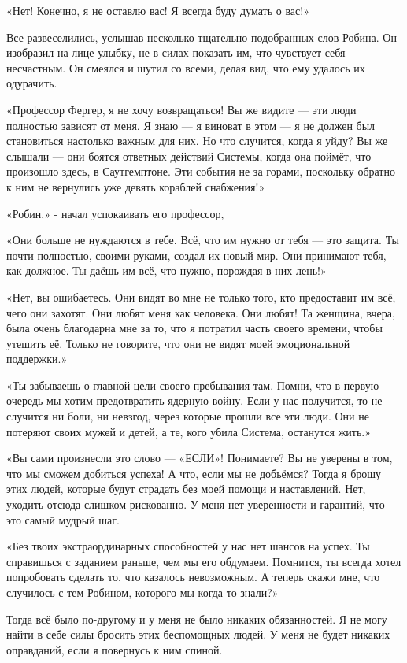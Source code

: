 \documentclass[a4paper,12pt]{book}
\begin{document}
«Нет! Конечно, я не оставлю вас! Я всегда буду думать о вас!»
\par
Все развеселились, услышав несколько тщательно подобранных слов Робина. Он изобразил на лице улыбку, не в силах показать им, что чувствует себя несчастным. Он смеялся и шутил со всеми, делая вид, что ему удалось их одурачить.\\
\par
«Профессор Фергер, я не хочу возвращаться! Вы же видите — эти люди полностью зависят от меня. Я знаю — я виноват в этом — я не должен был становиться настолько важным для них. Но что случится, когда я уйду? Вы же слышали — они боятся ответных действий Системы, когда она поймёт, что произошло здесь, в Саутгемптоне. Эти события не за горами, поскольку обратно к ним не вернулись уже девять кораблей снабжения!»
\par
«Робин,» - начал успокаивать его профессор,
\par
«Они больше не нуждаются в тебе. Всё, что им нужно от тебя — это защита. Ты почти полностью, своими руками, создал их новый мир. Они принимают тебя, как должное. Ты даёшь им всё, что нужно, порождая в них лень!»
\par
«Нет, вы ошибаетесь. Они видят во мне не только того, кто предоставит им всё, чего они захотят. Они любят меня как человека. Они любят! Та женщина, вчера, была очень благодарна мне за то, что я потратил часть своего времени, чтобы утешить её. Только не говорите, что они не видят моей эмоциональной поддержки.»
\par
«Ты забываешь о главной цели своего пребывания там. Помни, что в первую очередь мы хотим предотвратить ядерную войну. Если у нас получится, то не случится ни боли, ни невзгод, через которые прошли все эти люди. Они не потеряют своих мужей и детей, а те, кого убила Система, останутся жить.»
\par
«Вы сами произнесли это слово — «ЕСЛИ»! Понимаете? Вы не уверены в том, что мы сможем добиться успеха! А что, если мы не добьёмся? Тогда я брошу этих людей, которые будут страдать без моей помощи и наставлений. Нет, уходить отсюда слишком рискованно. У меня нет уверенности и гарантий, что это самый мудрый шаг.
\par
«Без твоих экстраординарных способностей у нас нет шансов на успех. Ты справишься с заданием раньше, чем мы его обдумаем. Помнится, ты всегда хотел попробовать сделать то, что казалось невозможным. А теперь скажи мне, что случилось с тем Робином, которого мы когда-то знали?»
\par
Тогда всё было по-другому и у меня не было никаких обязанностей. Я не могу найти в себе силы бросить этих беспомощных людей. У меня не будет никаких оправданий, если я повернусь к ним спиной.
\end{document}
